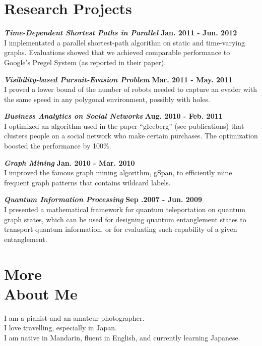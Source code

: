 \documentclass[margin,line]{res}
\begin{document}
\begin{resume}
\section{\sc Research Projects}
\vspace{-.1cm}
{\bf{\em Time-Dependent Shortest Paths in Parallel}}  \hfill {\bf Jan. 2011 - Jun. 2012}\\
I implementated a parallel shortest-path algorithm on static and time-varying graphs. Evaluations showed that we achieved comparable performance to Google's Pregel System (as reported in their paper).

{\bf{\em Visibility-based Pursuit-Evasion Problem}}  \hfill {\bf Mar. 2011 - May. 2011}\\
I proved a lower bound of the number of robots needed to capture an evader with the same speed in any polygonal environment, possibly with holes.

{\bf{\em Business Analytics on Social Networks}}  \hfill {\bf Aug. 2010 - Feb. 2011}\\
I optimized an algorithm used in the paper ``gIceberg'' (see publications) that clusters people on a social network who make certain purchases. The optimization boosted the performance by 100\%.

{\bf{\em Graph Mining}}  \hfill {\bf Jan. 2010 - Mar. 2010}\\
I improved the famous graph mining algorithm, gSpan, to efficiently mine frequent graph patterns that contains wildcard labels.

{\bf{\em Quantum Information Processing}} \hfill {\bf Sep .2007 - Jun. 2009}\\
I presented a mathematical framework for quantum teleportation on quantum graph states, which can be used for designing quantum entanglement states to transport quantum information, or for evaluating such capability of a given entanglement.

\section{\sc More \\About Me}
I am a pianist and an amateur photographer.\\
I love travelling, especially in Japan.\\
I am native in Mandarin, fluent in English, and currently learning Japanese.

\end{resume}
\end{document}
